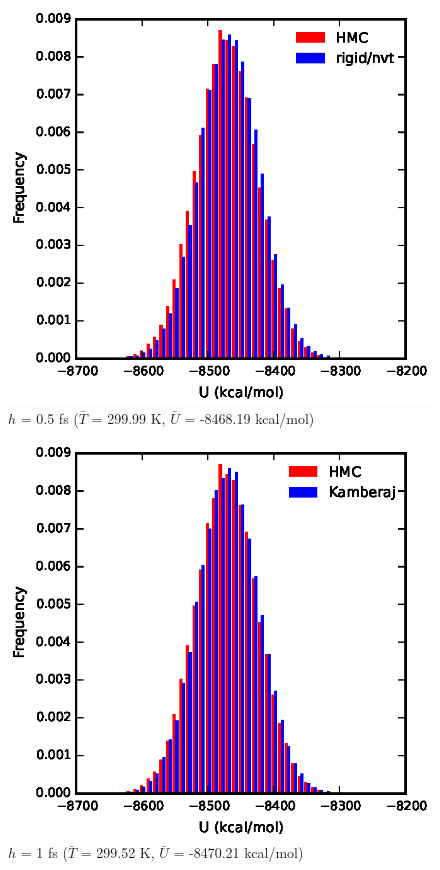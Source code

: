 \documentclass[journal=jctcce,manuscript=article,layout=twocolumn]{achemso}
\newcommand{\timestep}{h}
\begin{document}
\begin{figure}
    \caption{$\timestep$ = 0.5 fs ($\bar{T}$ = 299.99 K, $\bar{U}$ = -8468.19 kcal/mol)}
	\includegraphics{potenergy_05}
\end{figure}

\begin{figure}
    \caption{$\timestep$ = 1 fs ($\bar{T}$ = 299.52 K, $\bar{U}$ = -8470.21 kcal/mol)}
	\includegraphics{potenergy_kamb}
\end{figure}
\end{document}
